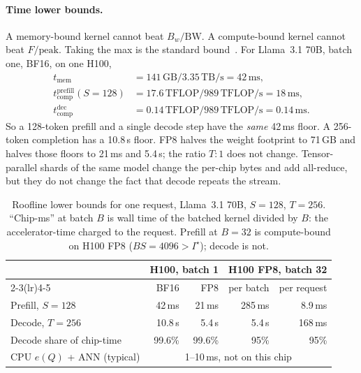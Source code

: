 \paragraph{Time lower bounds.}
A memory-bound kernel cannot beat $B_w/\mathrm{BW}$. A compute-bound kernel cannot beat $F/\mathrm{peak}$. Taking the max is the standard bound~\citep{pope2023efficiently}. For Llama~3.1 70B, batch one, BF16, on one H100,
\begin{align*}
t_{\mathrm{mem}}
  &= 141\,\mathrm{GB}/3.35\,\mathrm{TB/s}
  = 42\,\mathrm{ms}, \\
t_{\mathrm{comp}}^{\mathrm{prefill}}(S{=}128)
  &= 17.6\,\mathrm{TFLOP}/989\,\mathrm{TFLOP/s}
  = 18\,\mathrm{ms}, \\
t_{\mathrm{comp}}^{\mathrm{dec}}
  &= 0.14\,\mathrm{TFLOP}/989\,\mathrm{TFLOP/s}
  = 0.14\,\mathrm{ms}.
\end{align*}
So a 128-token prefill and a single decode step have the \emph{same} 42\,ms floor. A 256-token completion has a 10.8\,s floor. FP8 halves the weight footprint to 71\,GB and halves those floors to 21\,ms and 5.4\,s; the ratio $T{:}1$ does not change. Tensor-parallel shards of the same model change the per-chip bytes and add all-reduce, but they do not change the fact that decode repeats the stream.

\begin{table}[t]
\centering
\caption{Roofline lower bounds for one request, Llama~3.1 70B, $S=128$, $T=256$. ``Chip-ms'' at batch $B$ is wall time of the batched kernel divided by $B$: the accelerator-time charged to the request. Prefill at $B=32$ is compute-bound on H100 FP8 ($BS=4096>I^\star$); decode is not.}
\label{tab:times}
\small
\begin{tabular}{@{}lrrrr@{}}
\toprule
 & \multicolumn{2}{c}{H100, batch 1} & \multicolumn{2}{c}{H100 FP8, batch 32} \\
\cmidrule(lr){2-3}\cmidrule(lr){4-5}
 & BF16 & FP8 & per batch & per request \\
\midrule
Prefill, $S{=}128$ & 42\,ms & 21\,ms & 285\,ms & 8.9\,ms \\
Decode, $T{=}256$ & 10.8\,s & 5.4\,s & 5.4\,s & 168\,ms \\
Decode share of chip-time & 99.6\% & 99.6\% & 95\% & 95\% \\
CPU $e(Q)$ + ANN (typical) & \multicolumn{4}{c}{1--10\,ms, not on this chip} \\
\bottomrule
\end{tabular}
\end{table}


